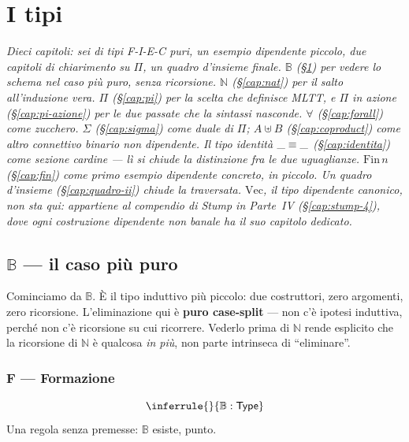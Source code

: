 \part{I tipi}

\noindent\itshape Dieci capitoli: sei di tipi F-I-E-C puri, un esempio
dipendente piccolo, due capitoli di chiarimento su $\Pi$, un quadro
d'insieme finale. $\mathbb{B}$ (\S\ref{cap:bool}) per vedere lo schema nel
caso pi\`u puro, senza ricorsione. $\mathbb{N}$ (\S\ref{cap:nat}) per il salto
all'induzione vera. $\Pi$ (\S\ref{cap:pi}) per la scelta che definisce MLTT,
e $\Pi$ in azione (\S\ref{cap:pi-azione}) per le due passate che la sintassi
nasconde. $\forall$ (\S\ref{cap:forall}) come zucchero. $\Sigma$
(\S\ref{cap:sigma}) come duale di $\Pi$; $A \uplus B$ (\S\ref{cap:coproduct})
come altro connettivo binario non dipendente. Il tipo identit\`a $\_\equiv\_$
(\S\ref{cap:identita}) come sezione cardine --- l\`i si chiude la distinzione
fra le due uguaglianze. $\mathrm{Fin}\,n$ (\S\ref{cap:fin}) come primo esempio
dipendente concreto, in piccolo. Un quadro d'insieme (\S\ref{cap:quadro-ii})
chiude la traversata. $\mathrm{Vec}$, il tipo dipendente canonico, \emph{non}
sta qui: appartiene al compendio di Stump in Parte~IV (\S\ref{cap:stump-4}),
dove ogni costruzione dipendente non banale ha il suo capitolo dedicato.\upshape

\bigskip

\chapter{$\mathbb{B}$ --- il caso pi\`u puro}\label{cap:bool}

Cominciamo da $\mathbb{B}$. \`E il tipo induttivo pi\`u piccolo: due costruttori, zero argomenti, zero ricorsione. L'eliminazione qui \`e \textbf{puro case-split} --- non c'\`e ipotesi induttiva, perch\'e non c'\`e ricorsione su cui ricorrere. Vederlo prima di $\mathbb{N}$ rende esplicito che la ricorsione di $\mathbb{N}$ \`e qualcosa \emph{in pi\`u}, non parte intrinseca di ``eliminare''.

\section*{F --- Formazione}
\[
\inferrule{ }{\mathbb{B} : \Type}
\]
Una regola senza premesse: $\mathbb{B}$ esiste, punto.

